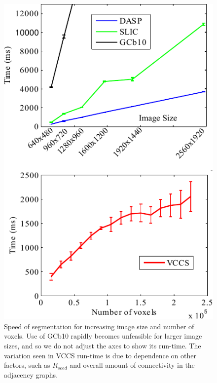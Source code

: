 \begin{figure}[t]
\begin{center}
\includegraphics[width=0.95\linewidth]{figures/CVPR2013/Speed.pdf}
\end{center}
   \caption[Segmentation Speed]{Speed of segmentation for increasing image size and number of voxels. Use of GCb10 rapidly becomes unfeasible for larger image sizes, and so we do not adjust the axes to show its run-time. The variation seen in VCCS run-time is due to dependence on other factors, such as ${R}_{seed}$ and overall amount of connectivity in the adjacency graphs.}
\label{fig:SegmentationSpeed}
\end{figure}

